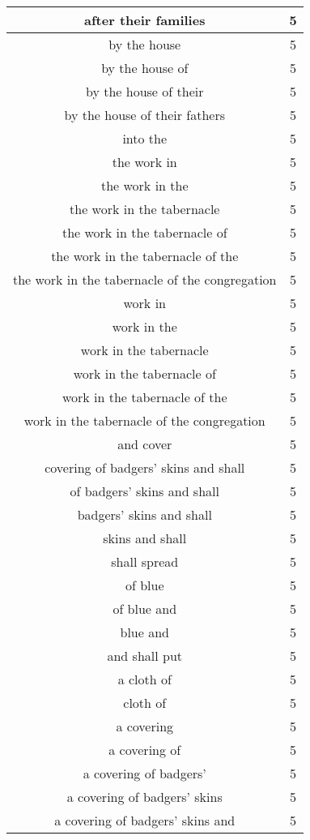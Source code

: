 \begin{center}
\begin{longtable}{|c|c|}
after their families & 5\\ \hline 
by the house & 5\\ \hline 
by the house of & 5\\ \hline 
by the house of their & 5\\ \hline 
by the house of their fathers & 5\\ \hline 
into the & 5\\ \hline 
the work in & 5\\ \hline 
the work in the & 5\\ \hline 
the work in the tabernacle & 5\\ \hline 
the work in the tabernacle of & 5\\ \hline 
the work in the tabernacle of the & 5\\ \hline 
the work in the tabernacle of the congregation & 5\\ \hline 
work in & 5\\ \hline 
work in the & 5\\ \hline 
work in the tabernacle & 5\\ \hline 
work in the tabernacle of & 5\\ \hline 
work in the tabernacle of the & 5\\ \hline 
work in the tabernacle of the congregation & 5\\ \hline 
and cover & 5\\ \hline 
covering of badgers' skins and shall & 5\\ \hline 
of badgers' skins and shall & 5\\ \hline 
badgers' skins and shall & 5\\ \hline 
skins and shall & 5\\ \hline 
shall spread & 5\\ \hline 
of blue & 5\\ \hline 
of blue and & 5\\ \hline 
blue and & 5\\ \hline 
and shall put & 5\\ \hline 
a cloth of & 5\\ \hline 
cloth of & 5\\ \hline 
a covering & 5\\ \hline 
a covering of & 5\\ \hline 
a covering of badgers' & 5\\ \hline 
a covering of badgers' skins & 5\\ \hline 
a covering of badgers' skins and & 5\\ \hline 

\end{longtable}
\end{center}
